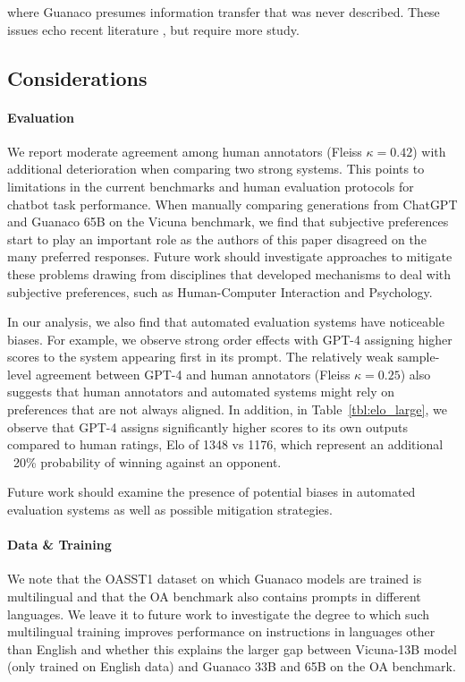 where {Guanaco} presumes information transfer that was never described. These issues echo recent literature \cite{sap2022neural}, but require more study.

\subsection{Considerations}
\label{ssec:considerations}

\paragraph{Evaluation}

We report moderate agreement among human annotators (Fleiss $\kappa=0.42$) with additional deterioration when comparing two strong systems. This points to limitations in the current benchmarks and human evaluation protocols for chatbot task performance. When manually comparing generations from ChatGPT and {Guanaco} 65B on the Vicuna benchmark, we find that subjective preferences start to play an important role as the authors of this paper disagreed on the many preferred responses. Future work should investigate approaches to mitigate these problems drawing from disciplines that developed mechanisms to deal with subjective preferences, such as Human-Computer Interaction and Psychology.

In our analysis, we also find that automated evaluation systems have noticeable biases. For example, we observe strong order effects with GPT-4 assigning higher scores to the system appearing first in its prompt. The relatively weak sample-level agreement between GPT-4 and human annotators (Fleiss $\kappa=0.25$) also suggests that human annotators and automated systems might rely on preferences that are not always aligned. In addition, in Table~\ref{tbl:elo_large}, we observe that GPT-4 assigns significantly higher scores to its own outputs compared to human ratings, Elo of 1348 vs 1176, which represent an additional ~20\% probability of winning against an opponent. 

Future work should examine the presence of potential biases in automated evaluation systems as well as possible mitigation strategies.

\paragraph{Data \& Training} We note that the OASST1 dataset  on which {Guanaco} models are trained is multilingual and that the OA benchmark also contains prompts in different languages. We leave it to future work to investigate the degree to which such multilingual training improves performance on instructions in languages other than English and whether this explains the larger gap between Vicuna-13B model (only trained on English data) and {Guanaco} 33B and 65B on the OA benchmark.


